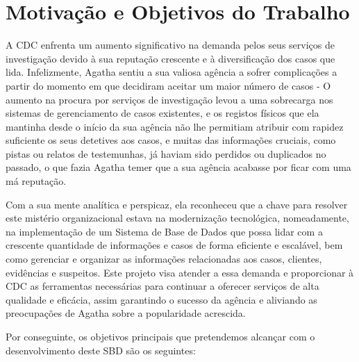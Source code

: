 \documentclass[a4paper,12pt]{scrreprt}
\begin{document}
    \section{Motivação e Objetivos do Trabalho}
    A CDC enfrenta um aumento significativo na demanda pelos seus serviços de investigação devido à
    sua reputação crescente e à diversificação dos casos que lida. Infelizmente, Agatha sentiu a sua
    valiosa agência a sofrer complicações a partir do momento em que decidiram aceitar um maior número
    de casos - O aumento na procura por serviços de investigação levou a uma sobrecarga nos sistemas de
    gerenciamento de casos existentes, e os registos físicos que ela mantinha desde o início da sua
    agência não lhe permitiam atribuir com rapidez suficiente os seus detetives aos casos, e muitas das
    informações cruciais, como pistas ou relatos de testemunhas, já haviam sido perdidos ou duplicados
    no passado, o que fazia Agatha temer que a sua agência acabasse por ficar com uma má reputação.
    \par Com a sua mente analítica e perspicaz, ela reconheceu que a chave para resolver este mistério
    organizacional estava  na modernização tecnológica, nomeadamente, na implementação de um Sistema de
    Base de Dados que possa lidar com a crescente quantidade de informações e casos de forma eficiente e
    escalável, bem como gerenciar e organizar as informações relacionadas aos casos, clientes, evidências
    e suspeitos. Este projeto visa atender a essa demanda e proporcionar à CDC as ferramentas necessárias
    para continuar a oferecer serviços de alta qualidade e eficácia, assim garantindo o sucesso da agência
    e aliviando as preocupações de Agatha sobre a popularidade acrescida.
    \par Por conseguinte, os objetivos principais que pretendemos alcançar com o desenvolvimento deste SBD são os seguintes:
\end{document}
